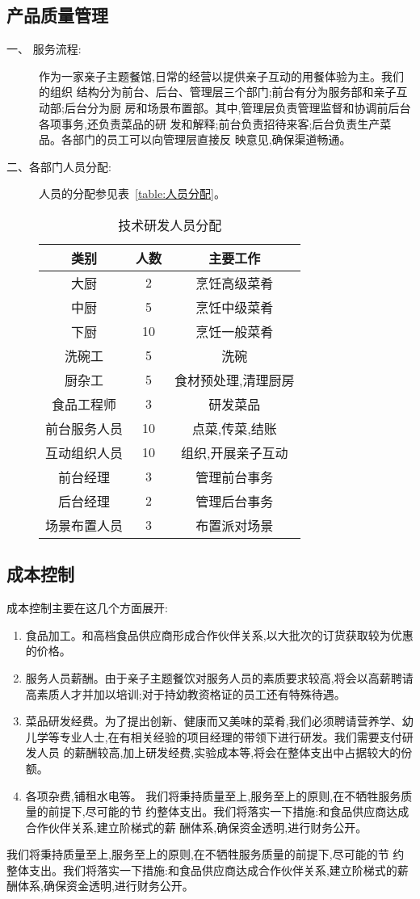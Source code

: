 \subsection{产品质量管理}
\begin{description}
\item[一、 服务流程:]
作为一家亲子主题餐馆,日常的经营以提供亲子互动的用餐体验为主。我们的组织
结构分为前台、后台、管理层三个部门;前台有分为服务部和亲子互动部;后台分为厨
房和场景布置部。其中,管理层负责管理监督和协调前后台各项事务,还负责菜品的研
发和解释;前台负责招待来客;后台负责生产菜品。各部门的员工可以向管理层直接反
映意见,确保渠道畅通。

\item[二、各部门人员分配:]
人员的分配参见表~\vref{table:人员分配}。
\begin{table}
\centering
\caption{技术研发人员分配}
\label{table:人员分配}
\begin{tabular}{|c|c|c|}
\hline
类别&人数&主要工作\\ \hline
大厨&2&烹饪高级菜肴\\ \hline
中厨&5&烹饪中级菜肴\\ \hline
下厨&10&烹饪一般菜肴\\ \hline
洗碗工&5&洗碗\\ \hline
厨杂工&5&食材预处理,清理厨房\\ \hline
食品工程师&3&研发菜品\\ \hline
前台服务人员&10&点菜,传菜,结账\\ \hline
互动组织人员&10&组织,开展亲子互动\\ \hline
前台经理&3&管理前台事务\\ \hline
后台经理&2&管理后台事务\\ \hline
场景布置人员&3&布置派对场景\\ \hline
\end{tabular}
\end{table}
\end{description}

\subsection{成本控制}
成本控制主要在这几个方面展开:
\begin{enumerate}
\item 食品加工。和高档食品供应商形成合作伙伴关系,以大批次的订货获取较为优惠
的价格。
\item 服务人员薪酬。由于亲子主题餐饮对服务人员的素质要求较高,将会以高薪聘请
高素质人才并加以培训;对于持幼教资格证的员工还有特殊待遇。
\item 菜品研发经费。为了提出创新、健康而又美味的菜肴,我们必须聘请营养学、幼
儿学等专业人士,在有相关经验的项目经理的带领下进行研发。我们需要支付研发人员
的薪酬较高,加上研发经费,实验成本等,将会在整体支出中占据较大的份额。
\item 各项杂费,铺租水电等。
我们将秉持质量至上,服务至上的原则,在不牺牲服务质量的前提下,尽可能的节
约整体支出。我们将落实一下措施:和食品供应商达成合作伙伴关系,建立阶梯式的薪
酬体系,确保资金透明,进行财务公开。
\end{enumerate}
我们将秉持质量至上,服务至上的原则,在不牺牲服务质量的前提下,尽可能的节
约整体支出。我们将落实一下措施:和食品供应商达成合作伙伴关系,建立阶梯式的薪
酬体系,确保资金透明,进行财务公开。

